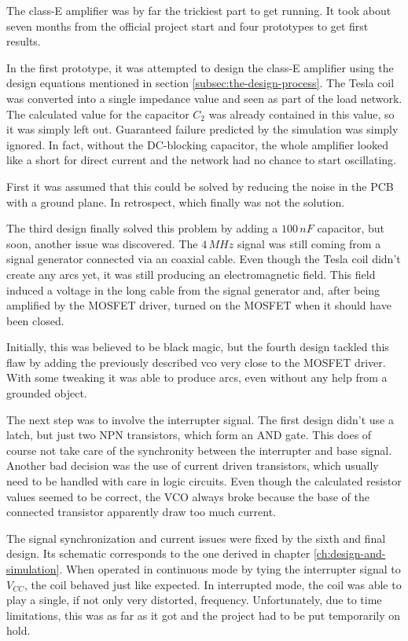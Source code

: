 The class-E amplifier was by far the trickiest part to get running. It took about seven months from the official project start and four prototypes to get first results.

In the first prototype, it was attempted to design the class-E amplifier using the design equations mentioned in section \ref{subsec:the-design-process}. The Tesla coil was converted into a single impedance value and seen as part of the load network. The calculated value for the capacitor \(C_2\) was already contained in this value, so it was simply left out. Guaranteed failure predicted by the simulation was simply ignored. In fact, without the DC-blocking capacitor, the whole amplifier looked like a short for direct current and the network had no chance to start oscillating.

First it was assumed that this could be solved by reducing the noise in the PCB with a ground plane. In retrospect, which finally was not the solution.

The third design finally solved this problem by adding a \(100\,nF\) capacitor, but soon, another issue was discovered. The \(4\,MHz\) signal was still coming from a signal generator connected via an coaxial cable. Even though the Tesla coil didn't create any arcs yet, it was still producing an electromagnetic field. This field induced a voltage in the long cable from the signal generator and, after being amplified by the MOSFET driver, turned on the MOSFET when it should have been closed.

Initially, this was believed to be black magic, but the fourth design tackled this flaw by adding the previously described \gls{vco} very close to the MOSFET driver. With some tweaking it was able to produce arcs, even without any help from a grounded object.

The next step was to involve the interrupter signal. The first design didn't use a latch, but just two NPN transistors, which form an AND gate. This does of course not take care of the synchronity between the interrupter and base signal. Another bad decision was the use of current driven transistors, which usually need to be handled with care in logic circuits. Even though the calculated resistor values seemed to be correct, the VCO always broke because the base of the connected transistor apparently draw too much current.

The signal synchronization and current issues were fixed by the sixth and final design. Its schematic corresponds to the one derived in chapter \ref{ch:design-and-simulation}. When operated in continuous mode by tying the interrupter signal to \(V_{CC}\), the coil behaved just like expected. In interrupted mode, the coil was able to play a single, if not only very distorted, frequency. Unfortunately, due to time limitations, this was as far as it got and the project had to be put temporarily on hold.

